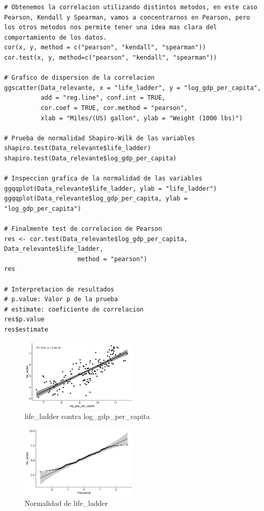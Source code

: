 \begin{enumerate}
\begin{lstlisting}[caption={Coeficiente de correlacion lineal de Pearson}, label=lst:rchunk1]
# Obtenemos la correlacion utilizando distintos metodos, en este caso Pearson, Kendall y Spearman, vamos a concentrarnos en Pearson, pero los otros metodos nos permite tener una idea mas clara del comportamiento de los datos.
cor(x, y, method = c("pearson", "kendall", "spearman"))
cor.test(x, y, method=c("pearson", "kendall", "spearman"))

# Grafico de dispersion de la correlacion
ggscatter(Data_relevante, x = "life_ladder", y = "log_gdp_per_capita", 
          add = "reg.line", conf.int = TRUE, 
          cor.coef = TRUE, cor.method = "pearson",
          xlab = "Miles/(US) gallon", ylab = "Weight (1000 lbs)")

# Prueba de normalidad Shapiro-Wilk de las variables
shapiro.test(Data_relevante$life_ladder) 
shapiro.test(Data_relevante$log_gdp_per_capita)

# Inspeccion grafica de la normalidad de las variables
ggqqplot(Data_relevante$life_ladder, ylab = "life_ladder")
ggqqplot(Data_relevante$log_gdp_per_capita, ylab = "log_gdp_per_capita")

# Finalmente test de correlacion de Pearson
res <- cor.test(Data_relevante$log_gdp_per_capita, Data_relevante$life_ladder, 
                    method = "pearson")
res

# Interpretacion de resultados
# p.value: Valor p de la prueba
# estimate: coeficiente de correlacion
res$p.value
res$estimate
\end{lstlisting}
\newpage

\begin{figure}[!ht]
    \centering
    \includegraphics[width=0.5\textwidth]{figures/plot_Aa.png}
    \caption{life\_ladder contra log\_gdp\_per\_capita}
    \label{fig:correlaciones1}
\end{figure}

\begin{figure}[!ht]
    \centering
    \includegraphics[width=0.5\textwidth]{figures/plot_Ab.png}
    \caption{Normalidad de life\_ladder}
    \label{fig:correlaciones2}
\end{figure}


\end{enumerate}
